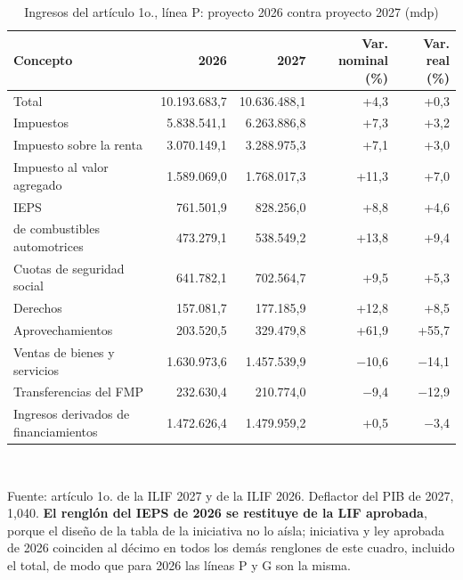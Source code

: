 \begin{table}[htbp]\centering\small
\caption{Ingresos del artículo 1o., línea P: proyecto 2026 contra proyecto 2027 (mdp)}\label{cua:ing}
\begin{tabular}{lrrrr}
\toprule
Concepto & 2026 & 2027 & Var. nominal (\%) & Var. real (\%) \\
\midrule
Total & 10.193.683,7 & 10.636.488,1 & +4,3 & +0,3 \\
Impuestos & 5.838.541,1 & 6.263.886,8 & +7,3 & +3,2 \\
\quad Impuesto sobre la renta & 3.070.149,1 & 3.288.975,3 & +7,1 & +3,0 \\
\quad Impuesto al valor agregado & 1.589.069,0 & 1.768.017,3 & +11,3 & +7,0 \\
\quad IEPS & 761.501,9 & 828.256,0 & +8,8 & +4,6 \\
\quad\quad de combustibles automotrices & 473.279,1 & 538.549,2 & +13,8 & +9,4 \\
Cuotas de seguridad social & 641.782,1 & 702.564,7 & +9,5 & +5,3 \\
Derechos & 157.081,7 & 177.185,9 & +12,8 & +8,5 \\
Aprovechamientos & 203.520,5 & 329.479,8 & +61,9 & +55,7 \\
Ventas de bienes y servicios & 1.630.973,6 & 1.457.539,9 & $-$10,6 & $-$14,1 \\
Transferencias del FMP & 232.630,4 & 210.774,0 & $-$9,4 & $-$12,9 \\
Ingresos derivados de financiamientos & 1.472.626,4 & 1.479.959,2 & +0,5 & $-$3,4 \\
\bottomrule
\end{tabular}
\\[2pt]\begin{minipage}{0.92\textwidth}\scriptsize Fuente: artículo 1o. de la ILIF 2027 y de la ILIF 2026. Deflactor del PIB de 2027, 1,040. \textbf{El renglón del IEPS de 2026 se restituye de la LIF aprobada}, porque el diseño de la tabla de la iniciativa no lo aísla; iniciativa y ley aprobada de 2026 coinciden al décimo en todos los demás renglones de este cuadro, incluido el total, de modo que para 2026 las líneas P y G son la misma.\end{minipage}
\end{table}
